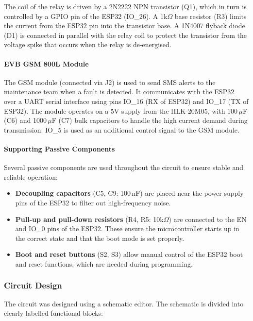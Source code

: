 \documentclass{article}
\begin{document}
 The coil of the relay is driven by a 2N2222 NPN transistor (Q1), which in turn is controlled by a GPIO pin of the ESP32 (IO\_26). A 1k$\Omega$ base resistor (R3) limits the current from the ESP32 pin into the transistor base. A 1N4007 flyback diode (D1) is connected in parallel with the relay coil to protect the transistor from the voltage spike that occurs when the relay is de-energised.

\paragraph{EVB GSM 800L Module}

The GSM module (connected via J2) is used to send SMS alerts to the maintenance team when a fault is detected. It communicates with the ESP32 over a UART serial interface using pins IO\_16 (RX of ESP32) and IO\_17 (TX of ESP32). The module operates on a 5V supply from the HLK-20M05, with 100\,$\mu$F (C6) and 1000\,$\mu$F (C7) bulk capacitors to handle the high current demand during transmission. IO\_5 is used as an additional control signal to the GSM module.

\paragraph{Supporting Passive Components}

Several passive components are used throughout the circuit to ensure stable and reliable operation:

\begin{itemize}
    \item \textbf{Decoupling capacitors} (C5, C9: 100\,nF) are placed near the power supply pins of the ESP32 to filter out high-frequency noise.
    \item \textbf{Pull-up and pull-down resistors} (R4, R5: 10k$\Omega$) are connected to the EN and IO\_0 pins of the ESP32. These ensure the microcontroller starts up in the correct state and that the boot mode is set properly.
    \item \textbf{Boot and reset buttons} (S2, S3) allow manual control of the ESP32 boot and reset functions, which are needed during programming.
\end{itemize}

\subsubsection{Circuit Design}

The circuit was designed using a schematic editor. The schematic is divided into clearly labelled functional blocks:
\end{document}
